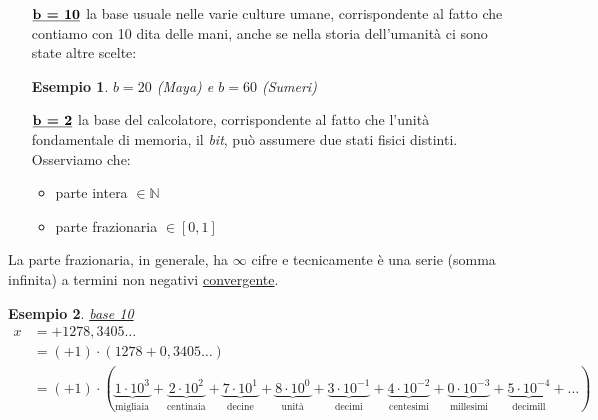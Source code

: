 \documentclass[12pt]{article}
\newtheorem*{esempio}{Esempio}
\begin{document}
\begin{itemize}
	\item[$\uline{\textbf{b = 10}}$] la base usuale nelle varie culture umane, corrispondente al fatto che contiamo con 10 dita delle mani, anche se nella storia dell'umanità ci sono state altre scelte:
	\begin{esempio}
	$b = 20$ (Maya) e $b = 60$ (Sumeri)
	\end{esempio}
	\item[$\uline{\textbf{b = 2}}$] la base del calcolatore, corrispondente al fatto che l'unità fondamentale di memoria, il \textit{bit}, può assumere due stati fisici distinti. \\
	Osserviamo che:
	\begin{itemize}
	    \item parte intera $\in \mathbb{N}$
	    \item parte frazionaria $\in [0,1]$
	\end{itemize}
\end{itemize}
La parte frazionaria, in generale, ha $\infty$ cifre e tecnicamente è una serie (somma infinita) a termini non negativi \uline{convergente}.
\begin{esempio}
\uline{base 10}
\[ \begin{split}
    x & = +1278,3405 \dotsc \\
    & = (+1) \cdot (1278 + 0,3405 \dotsc) \\
    & = (+1) \cdot ( \underbrace{1 \cdot 10^3}_{\text {migliaia}} + %
    \underbrace{2 \cdot 10^2}_{\text {centinaia}} + %
    \underbrace{7 \cdot 10^1}_{\text {decine}} + %
    \underbrace{8 \cdot 10^0}_{\text {unità}} + %
    \underbrace{3 \cdot 10^{-1}}_{\text {decimi}} + %
    \underbrace{4 \cdot 10^{-2}}_{\text {centesimi}} + %
    \underbrace{0 \cdot 10^{-3}}_{\text {millesimi}} + %
    \underbrace{5 \cdot 10^{-4}}_{\text {decimill}} + \dotsc) 
\end{split} \]
\end{esempio}
\end{document}
